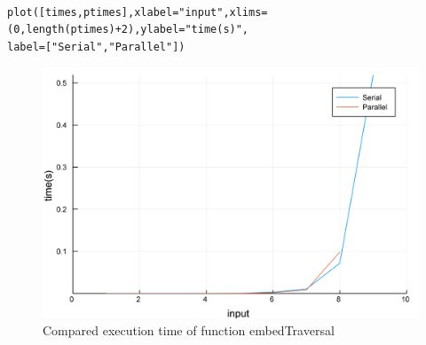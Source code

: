\documentclass[a4paper,12pt]{article}
\begin{document}
\noindent{}
\begin{Verbatim}[fontsize=\footnotesize]

plot([times,ptimes],xlabel="input",xlims=(0,length(ptimes)+2),ylabel="time(s)",
label=["Serial","Parallel"])

\end{Verbatim}

\begin{figure}[!h]
	\centering
	\includegraphics[scale=0.08]{embedTraversalC.png}
	\caption{Compared execution time of function embedTraversal}
\end{figure}

\newpage
\end{document}
